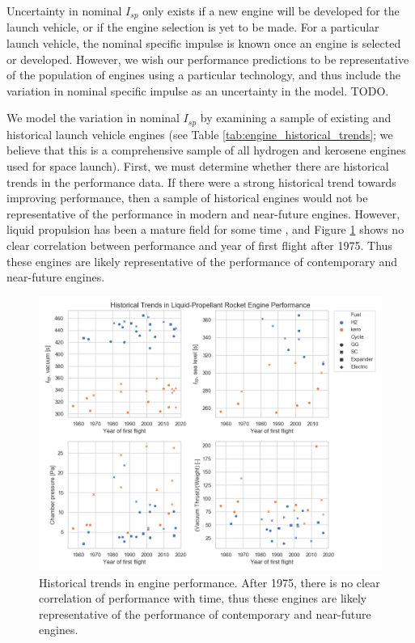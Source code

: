 \documentclass[conf]{../new-aiaa}
\begin{document}
Uncertainty in nominal $I_{sp}$ only exists if a new engine will be developed for the launch vehicle, or if the engine selection is yet to be made. For a particular launch vehicle, the nominal specific impulse is known once an engine is selected or developed. However, we wish our performance predictions to be representative of the population of engines using a particular technology, and thus include the variation in nominal specific impulse as an uncertainty in the model. TODO.

We model the variation in nominal $I_{sp}$ by examining a sample of existing and historical launch vehicle engines (see Table \ref{tab:engine_historical_trends}; we believe that this is a comprehensive sample of all hydrogen and kerosene engines used for space launch). First, we must determine whether there are historical trends in the performance data. If there were a strong historical trend towards improving performance, then a sample of historical engines would not be representative of the performance in modern and near-future engines. However, liquid propulsion has been a mature field for some time \cite{hist_lpre}, and Figure \ref{fig:engine_historical_trends} shows no clear correlation between performance and year of first flight after 1975. Thus these engines are likely representative of the performance of contemporary and near-future engines.


\begin{figure}[hbt!]
    \centering
    \includegraphics[width=1\textwidth]{engine_trends/engine_historical_trends}
    \caption{\label{fig:engine_historical_trends} Historical trends in engine performance. After 1975, there is no clear correlation of performance with time, thus these engines are likely representative of the performance of contemporary and near-future engines.}
\end{figure}
\end{document}
